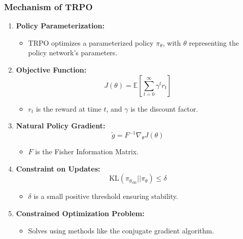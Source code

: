 \documentclass{beamer}
\begin{document}
\begin{frame}[fragile]
    \frametitle{Mechanism of TRPO}
    \begin{enumerate}
        \item \textbf{Policy Parameterization:}
            \begin{itemize}
                \item TRPO optimizes a parameterized policy \( \pi_\theta \), with \( \theta \) representing the policy network's parameters.
            \end{itemize}
        \item \textbf{Objective Function:}
            \begin{equation}
                J(\theta) = \mathbb{E} \left[ \sum_{t=0}^{\infty} \gamma^t r_t \right]
            \end{equation}
            \begin{itemize}
                \item \( r_t \) is the reward at time \( t \), and \( \gamma \) is the discount factor.
            \end{itemize}
        \item \textbf{Natural Policy Gradient:}
            \begin{equation}
                \tilde{g} = F^{-1} \nabla_\theta J(\theta)
            \end{equation}
            \begin{itemize}
                \item \( F \) is the Fisher Information Matrix.
            \end{itemize}
        \item \textbf{Constraint on Updates:}
            \begin{equation}
                \text{KL}(\pi_{\theta_{\text{old}}} || \pi_\theta) \leq \delta
            \end{equation}
            \begin{itemize}
                \item \( \delta \) is a small positive threshold ensuring stability.
            \end{itemize}
        \item \textbf{Constrained Optimization Problem:}
            \begin{itemize}
                \item Solves using methods like the conjugate gradient algorithm.
            \end{itemize}
    \end{enumerate}
\end{frame}
\end{document}
